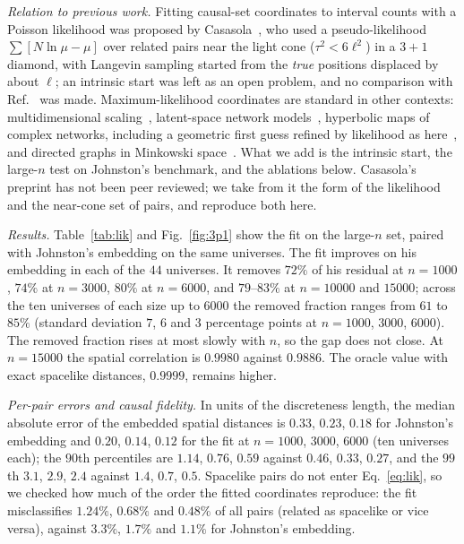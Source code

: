 \documentclass[prd,twocolumn,superscriptaddress,nofootinbib,amsmath,amssymb,floatfix]{revtex4-2}
\begin{document}
\emph{Relation to previous work.} Fitting causal-set coordinates to interval counts with a Poisson likelihood was proposed by Casasola~\cite{Casasola26}, who used a pseudo-likelihood $\sum[N\ln\mu-\mu]$ over related pairs near the light cone ($\tau^2<6\ell^2$) in a $3+1$ diamond, with Langevin sampling started from the \emph{true} positions displaced by about $\ell$; an intrinsic start was left as an open problem, and no comparison with Ref.~\cite{Johnston25} was made. Maximum-likelihood coordinates are standard in other contexts: multidimensional scaling~\cite{Ramsay77}, latent-space network models~\cite{Hoff02}, hyperbolic maps of complex networks, including a geometric first guess refined by likelihood as here~\cite{BPK10,Mercator19}, and directed graphs in Minkowski space~\cite{Sim21}. What we add is the intrinsic start, the large-$n$ test on Johnston's benchmark, and the ablations below. Casasola's preprint has not been peer reviewed; we take from it the form of the likelihood and the near-cone set of pairs, and reproduce both here.

\emph{Results.} Table~\ref{tab:lik} and Fig.~\ref{fig:3p1} show the fit on the large-$n$ set, paired with Johnston's embedding on the same universes. The fit improves on his embedding in each of the $44$ universes. It removes $72\%$ of his residual at $n=1000$, $74\%$ at $n=3000$, $80\%$ at $n=6000$, and $79$--$83\%$ at $n=10000$ and $15000$; across the ten universes of each size up to $6000$ the removed fraction ranges from $61$ to $85\%$ (standard deviation $7$, $6$ and $3$ percentage points at $n=1000$, $3000$, $6000$). The removed fraction rises at most slowly with $n$, so the gap does not close. At $n=15000$ the spatial correlation is $0.9980$ against $0.9886$. The oracle value with exact spacelike distances, $0.9999$, remains higher.

\emph{Per-pair errors and causal fidelity.} In units of the discreteness length, the median absolute error of the embedded spatial distances is $0.33$, $0.23$, $0.18$ for Johnston's embedding and $0.20$, $0.14$, $0.12$ for the fit at $n=1000$, $3000$, $6000$ (ten universes each); the $90$th percentiles are $1.14$, $0.76$, $0.59$ against $0.46$, $0.33$, $0.27$, and the $99$th $3.1$, $2.9$, $2.4$ against $1.4$, $0.7$, $0.5$. Spacelike pairs do not enter Eq.~\eqref{eq:lik}, so we checked how much of the order the fitted coordinates reproduce: the fit misclassifies $1.24\%$, $0.68\%$ and $0.48\%$ of all pairs (related as spacelike or vice versa), against $3.3\%$, $1.7\%$ and $1.1\%$ for Johnston's embedding.
\end{document}
